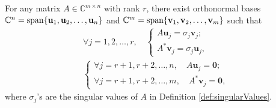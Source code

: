 \begin{thm}
\label{thm:SVD}
  For any matrix $A\in \mathbb{C}^{m\times n}$ with rank $r$, 
  there exist orthonormal bases
  $\mathbb{C}^n=\mathrm{span}\{\mathbf{u}_1, \mathbf{u}_2, \ldots, \mathbf{u}_n\}$
  and $\mathbb{C}^m=\mathrm{span}\{\mathbf{v}_1, \mathbf{v}_2, \ldots,
  \mathbf{v}_m\}$ such that
  \begin{subequations}
  \begin{align}
    \label{eq:SVDtransform}
    \forall j=1, 2, \ldots, r, \quad
    \left\{
    \begin{array}{l}
    A \mathbf{u}_j = \sigma_j \mathbf{v}_j;\\
    A^* \mathbf{v}_j = \sigma_j \mathbf{u}_j,
    \end{array}
    \right.
    \\
    \label{eq:SVDannihilate}
    \left\{
    \begin{array}{l}
    \forall j=r+1, r+2, \ldots, n, \quad
      A \mathbf{u}_j = \mathbf{0}; \\
    \forall j=r+1, r+2, \ldots, m, \quad
      A^* \mathbf{v}_j = \mathbf{0},
    \end{array}
    \right.
  \end{align}
  \end{subequations}
  where $\sigma_j$'s are the singular values of $A$
  in Definition \ref{def:singularValues}. 
\end{thm}

